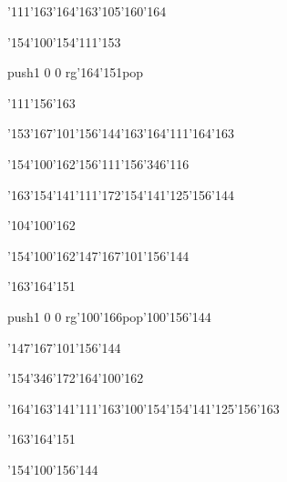 \null\vfill\ipa\centerline{\enskip\char'111\char'163\enskip\enskip\enskip\enskip\enskip\char'164\char'163\char'105\char'160\char'164}\medskip\centerline{\enskip\enskip\enskip\char'154\char'100\char'154\enskip\enskip\enskip\enskip\enskip\enskip\char'111\char'153}\medskip\centerline{\enskip\enskip\enskip\enskip\enskip\enskip\enskip\enskip\enskip\enskip\pdfcolorstack\match push{1 0 0 rg}\char'164\char'151\pdfcolorstack\match pop{}}\medskip\centerline{\enskip\enskip\enskip\enskip\char'111\char'156\char'163\enskip\enskip\enskip\enskip\enskip\enskip\enskip}\medskip\centerline{\enskip\enskip\enskip\enskip\enskip\char'153\char'167\char'101\char'156\char'144\enskip\char'163\char'164\char'111\char'164\char'163\enskip\enskip\enskip}\medskip\centerline{\enskip\enskip\enskip\enskip\enskip\enskip\enskip\char'154\char'100\char'162\enskip\char'156\char'111\char'156\enskip\char'346\char'116}\medskip\centerline{\enskip\char'163\char'154\char'141\char'111\char'172\enskip\enskip\enskip\enskip\char'154\char'141\char'125\char'156\char'144\enskip\enskip\enskip}\medskip\centerline{\enskip\enskip\enskip\enskip\enskip\enskip\enskip\enskip\enskip\enskip\enskip\enskip}\medskip\centerline{\enskip\enskip\enskip\enskip\enskip\enskip\enskip\char'104\char'100\char'162\enskip\enskip\enskip\enskip\enskip}\medskip\vfill\footline{\hfil\tt\folio\hfil}\eject
\null\vfill\ipa\centerline{\enskip\enskip\enskip\enskip\char'154\char'100\char'162\enskip\char'147\char'167\char'101\char'156\char'144}\medskip\centerline{\enskip\enskip\enskip\enskip\enskip\enskip\enskip\enskip\enskip\enskip\enskip\enskip\enskip\enskip}\medskip\centerline{\enskip\enskip\enskip\char'163\char'164\char'151\enskip\enskip\enskip\enskip\enskip\enskip}\medskip\centerline{\enskip\pdfcolorstack\match push{1 0 0 rg}\char'100\char'166\pdfcolorstack\match pop{}\enskip\char'100\char'156\char'144\enskip\enskip\enskip\enskip\enskip\enskip\enskip}\medskip\centerline{\enskip\enskip\enskip\enskip\enskip\char'147\char'167\char'101\char'156\char'144\enskip\enskip\enskip\enskip\enskip\enskip\enskip\enskip\enskip}\medskip\centerline{\enskip\enskip\enskip\char'154\char'346\char'172\enskip\enskip\enskip\enskip\enskip\char'164\char'100\char'162\enskip\enskip\enskip}\medskip\centerline{\enskip\char'164\char'163\char'141\char'111\char'163\enskip\char'100\char'154\enskip\char'154\char'141\char'125\char'156\char'163\enskip\enskip\enskip}\medskip\centerline{\enskip\enskip\enskip\char'163\char'164\char'151\enskip\enskip\enskip\enskip\enskip\enskip}\medskip\centerline{\enskip\enskip\enskip\enskip\enskip\enskip\enskip\enskip\enskip\enskip\enskip\char'154\char'100\char'156\char'144}\medskip\vfill\footline{\hfil\tt\folio\hfil}\eject
